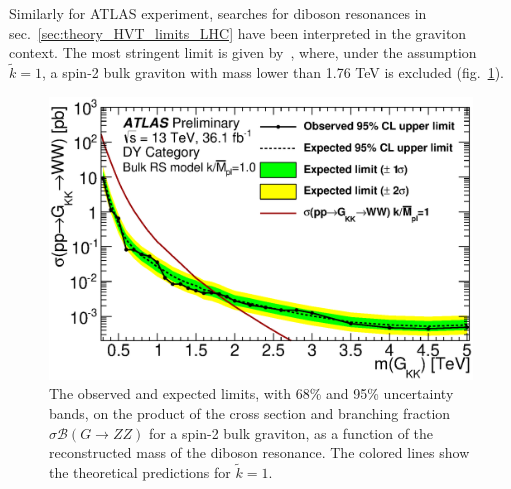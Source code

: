 Similarly for ATLAS experiment, searches for diboson resonances in sec.~\ref{sec:theory_HVT_limits_LHC} have been interpreted in the graviton context. The most stringent limit is given by~\cite{ATLAS-CONF-2017-051}, where, under the assumption $\tilde{k}=1$, a spin-2 bulk graviton with mass lower than 1.76 TeV is excluded (fig.~\ref{fig:theory_ATLAS-CONF-2017-051}).

\begin{figure}[!htb]
  \centering
    \includegraphics[width=.495\textwidth]{figures/ATLAS-CONF-2017-051_graviton.eps}
  \caption{The observed and expected limits, with 68\% and 95\% uncertainty bands, on the product of the cross section and branching fraction $\sigma \mathcal{B} (G \rightarrow ZZ)$ for a spin-2 bulk graviton, as a function of the reconstructed mass of the diboson resonance. The colored lines show the theoretical predictions for $\tilde{k}=1$.}
  \label{fig:theory_ATLAS-CONF-2017-051}
\end{figure}



